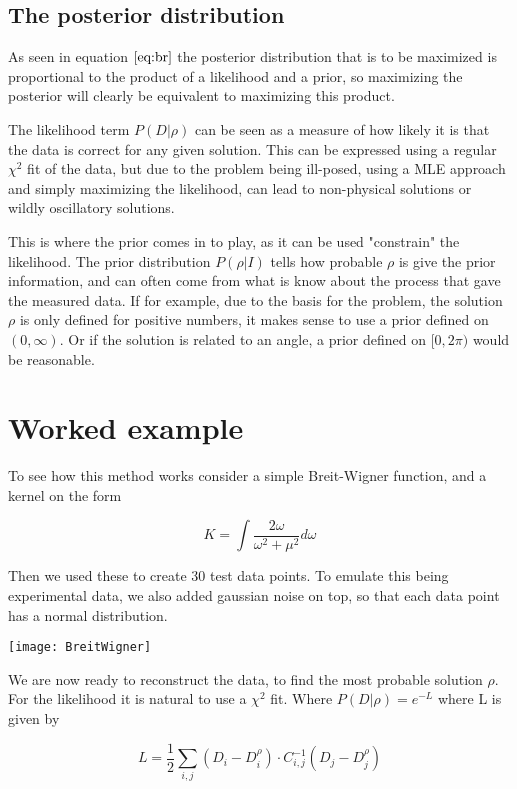 \documentclass[a4paper, oneside, 12pt]{book}
\begin{document}
\subsection{The posterior distribution}
As seen in equation $\ref{eq:br}$ the posterior distribution that is to be maximized is proportional to the product of a likelihood and a prior, so maximizing the posterior will clearly be equivalent to maximizing this product.

The likelihood term $P(D|\rho)$ can be seen as a measure of how likely it is that the data is correct for any given solution. This can be expressed using a regular $\chi^{2}$ fit of the data, but due to the problem being ill-posed, using a MLE approach and simply maximizing the likelihood, can lead to non-physical solutions or wildly oscillatory solutions.

This is where the prior comes in to play, as it can be used "constrain" the likelihood. The prior distribution $P(\rho|I)$ tells how probable $\rho$ is give the prior information, and can often come from what is know about the process that gave the measured data. If for example, due to the basis for the problem, the solution $\rho$ is only defined for positive numbers, it makes sense to use a prior defined on $(0,\infty)$. Or if the solution is related to an angle, a prior defined on $[0,2\pi)$ would be reasonable.


\section{Worked example}

To see how this method works consider a simple Breit-Wigner function, and a kernel on the form

\begin{equation}
K=\int \frac{2\omega}{\omega^{2}+\mu^{2}}d\omega
\end{equation} 

Then we used these to create 30 test data points. To emulate this being experimental data, we also added gaussian noise on top, so that each data point has a normal distribution.

\texttt{[image: BreitWigner]}

We are now ready to reconstruct the data, to find the most probable solution $\rho$. For the likelihood it is natural to use a $\chi^{2}$ fit. Where $P(D|\rho) = e^{-L}$ where L is given by

\begin{equation}
L=\frac{1}{2} \sum_{i,j} (D_{i}-D_{i}^{\rho}) \cdot C_{i,j}^{-1} (D_{j}-D_{j}^{\rho})
\end{equation}
\end{document}
